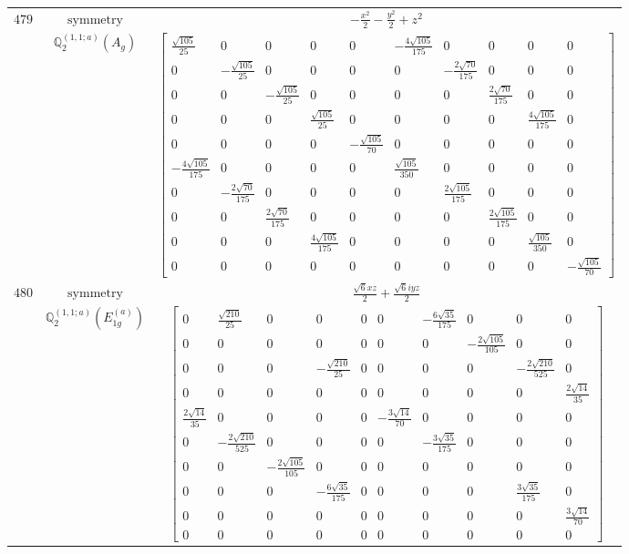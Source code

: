 \documentclass[fleqn,8pt,landscape]{jsarticle}
\begin{document}
\begin{longtable}{ccc}
$ 479 $ & $ \text{symmetry} $ & $ - \frac{x^{2}}{2} - \frac{y^{2}}{2} + z^{2} $ \\
$  $ & $ \mathbb{Q}_{2}^{(1,1;a)}(A_{g}) $ & $ \begin{bmatrix} \frac{\sqrt{105}}{25} & 0 & 0 & 0 & 0 & - \frac{4 \sqrt{105}}{175} & 0 & 0 & 0 & 0 \\ 0 & - \frac{\sqrt{105}}{25} & 0 & 0 & 0 & 0 & - \frac{2 \sqrt{70}}{175} & 0 & 0 & 0 \\ 0 & 0 & - \frac{\sqrt{105}}{25} & 0 & 0 & 0 & 0 & \frac{2 \sqrt{70}}{175} & 0 & 0 \\ 0 & 0 & 0 & \frac{\sqrt{105}}{25} & 0 & 0 & 0 & 0 & \frac{4 \sqrt{105}}{175} & 0 \\ 0 & 0 & 0 & 0 & - \frac{\sqrt{105}}{70} & 0 & 0 & 0 & 0 & 0 \\ - \frac{4 \sqrt{105}}{175} & 0 & 0 & 0 & 0 & \frac{\sqrt{105}}{350} & 0 & 0 & 0 & 0 \\ 0 & - \frac{2 \sqrt{70}}{175} & 0 & 0 & 0 & 0 & \frac{2 \sqrt{105}}{175} & 0 & 0 & 0 \\ 0 & 0 & \frac{2 \sqrt{70}}{175} & 0 & 0 & 0 & 0 & \frac{2 \sqrt{105}}{175} & 0 & 0 \\ 0 & 0 & 0 & \frac{4 \sqrt{105}}{175} & 0 & 0 & 0 & 0 & \frac{\sqrt{105}}{350} & 0 \\ 0 & 0 & 0 & 0 & 0 & 0 & 0 & 0 & 0 & - \frac{\sqrt{105}}{70} \end{bmatrix} $ \\ \hline
$ 480 $ & $ \text{symmetry} $ & $ \frac{\sqrt{6} x z}{2} + \frac{\sqrt{6} i y z}{2} $ \\
$  $ & $ \mathbb{Q}_{2}^{(1,1;a)}(E_{1g}^{(a)}) $ & $ \begin{bmatrix} 0 & \frac{\sqrt{210}}{25} & 0 & 0 & 0 & 0 & - \frac{6 \sqrt{35}}{175} & 0 & 0 & 0 \\ 0 & 0 & 0 & 0 & 0 & 0 & 0 & - \frac{2 \sqrt{105}}{105} & 0 & 0 \\ 0 & 0 & 0 & - \frac{\sqrt{210}}{25} & 0 & 0 & 0 & 0 & - \frac{2 \sqrt{210}}{525} & 0 \\ 0 & 0 & 0 & 0 & 0 & 0 & 0 & 0 & 0 & \frac{2 \sqrt{14}}{35} \\ \frac{2 \sqrt{14}}{35} & 0 & 0 & 0 & 0 & - \frac{3 \sqrt{14}}{70} & 0 & 0 & 0 & 0 \\ 0 & - \frac{2 \sqrt{210}}{525} & 0 & 0 & 0 & 0 & - \frac{3 \sqrt{35}}{175} & 0 & 0 & 0 \\ 0 & 0 & - \frac{2 \sqrt{105}}{105} & 0 & 0 & 0 & 0 & 0 & 0 & 0 \\ 0 & 0 & 0 & - \frac{6 \sqrt{35}}{175} & 0 & 0 & 0 & 0 & \frac{3 \sqrt{35}}{175} & 0 \\ 0 & 0 & 0 & 0 & 0 & 0 & 0 & 0 & 0 & \frac{3 \sqrt{14}}{70} \\ 0 & 0 & 0 & 0 & 0 & 0 & 0 & 0 & 0 & 0 \end{bmatrix} $ \\ \hline

\end{longtable}
\end{document}
